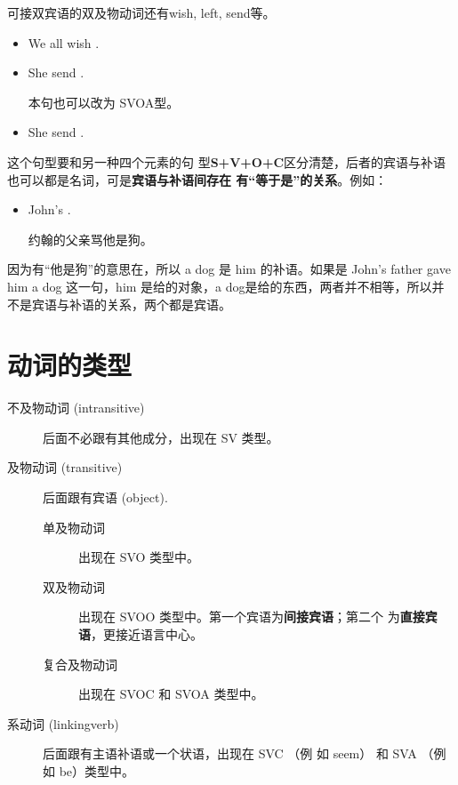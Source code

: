 可接双宾语的双及物动词还有wish, left, send等。
\begin{itemize}
\item We all wish  .

\item She send  .

  本句也可以改为 SVOA型。

\item She send  .

\end{itemize}


这个句型要和另一种四个元素的句
型\textbf{S+V+O+C}区分清楚，后者的宾语与补语也可以都是名词，可是\textbf{宾语与补语间存在
  有“等于是”的关系}。例如：
\begin{itemize}
\item John's    .

  约翰的父亲骂他是狗。
\end{itemize}

因为有“他是狗”的意思在，所以 a dog 是 him 的补语。如果是 John's father
gave him a dog 这一句，him 是给的对象，a dog是给的东西，两者并不相等，所以并
不是宾语与补语的关系，两个都是宾语。

\section{动词的类型}

\begin{description}
\item [不及物动词 (intransitive)] 后面不必跟有其他成分，出现在 SV 类型。

\item [及物动词 (transitive)] 后面跟有宾语 (object).
  \begin{description}
  \item[单及物动词] 出现在 SVO 类型中。
  \item[双及物动词] 出现在 SVOO 类型中。第一个宾语为\textbf{间接宾语}；第二个
    为\textbf{直接宾语}，更接近语言中心。

  \item[复合及物动词] 出现在 SVOC 和 SVOA 类型中。
  \end{description}

\item[系动词 (linkingverb)] 后面跟有主语补语或一个状语，出现在 SVC （例
  如 seem） 和 SVA （例如 be）类型中。
\end{description}


